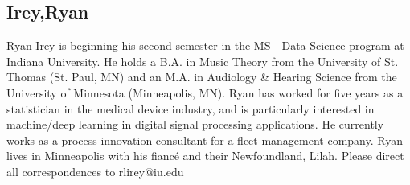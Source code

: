 \subsection{Irey,Ryan}

Ryan Irey is beginning his second semester in the MS - Data Science program at Indiana University. 
He holds a B.A. in Music Theory from the University of St. Thomas (St. Paul, MN) and an M.A. in 
Audiology & Hearing Science from the University of Minnesota (Minneapolis, MN). Ryan has worked for 
five years as a statistician in the medical device industry, and is particularly interested in 
machine/deep learning in digital signal processing applications. He currently works as a process 
innovation consultant for a fleet management company. Ryan lives in Minneapolis with his fiancé and 
their Newfoundland, Lilah. Please direct all correspondences to rlirey@iu.edu
